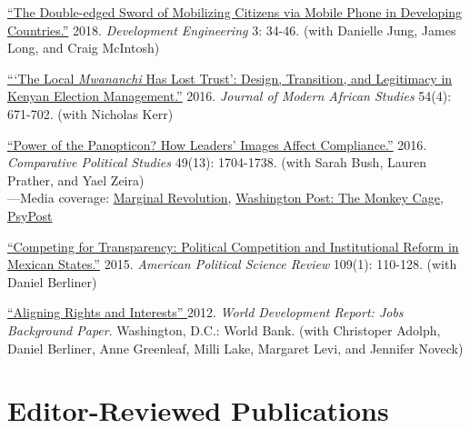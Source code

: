 \documentclass[margin,line]{res}
\begin{document}
{\begin{resume}
\begin{etaremune}
 \item  \href{https://doi.org/10.1016/j.deveng.2017.11.001}{``The Double-edged Sword of Mobilizing Citizens via Mobile Phone in
  Developing Countries.''} 2018. \emph{Development
    Engineering}  3: 34-46. (with Danielle Jung, James Long, and Craig McIntosh)

  \item \href{
https://doi.org/10.1017/S0022278X16000604}{```The Local \emph{Mwananchi} Has Lost Trust': Design, Transition,
  and Legitimacy in Kenyan Election Management.''} 2016. \emph{Journal
    of Modern African Studies} 54(4): 671-702. (with Nicholas Kerr)

 \item  \href{https://doi.org/10.1177/0010414016633228}
{``Power of the Panopticon? How Leaders' Images Affect Compliance.''}
  2016.  \emph{Comparative Political Studies} 49(13): 1704-1738. (with
  Sarah Bush, Lauren Prather, and Yael Zeira)\\
  ---Media coverage: \href{https://marginalrevolution.com/marginalrevolution/2016/07/results-free-review.html}{Marginal Revolution},
  \href{https://www.washingtonpost.com/news/monkey-cage/wp/2016/08/25/heres-what-happens-when-scientists-evaluate-research-without-knowing-the-results/?noredirect=on&utm_term=.77408b17a4a9}
  {Washington Post: The Monkey Cage}, \href{https://www.psypost.org/2016/12/scientists-investigate-subliminal-authoritarian-imagery-encourages-citizens-obey-46570}{ PsyPost}

 \item  \href{https://doi.org/10.1177/0010414016633228}{``Competing for Transparency: Political Competition and
  Institutional Reform in Mexican States.''} 2015. \emph{American
  Political Science Review} 109(1): 110-128. (with Daniel Berliner)


\item \href{http://siteresources.worldbank.org/EXTNWDR2013/Resources/8258024-1320950747192/8260293-1320956712276/8261091-1348683883703/WDR2013_bp_Aligning_Rights_and_Incentives.pdf}{``Aligning Rights and
Interests'' } 2012. \emph{World
  Development Report: Jobs Background Paper}. Washington, D.C.: World
Bank. (with Christoper Adolph, Daniel Berliner, Anne
Greenleaf, Milli Lake, Margaret Levi, and Jennifer Noveck)
\end{etaremune}


\section{\sc  Editor-Reviewed Publications}


\end{resume}}
\end{document}
